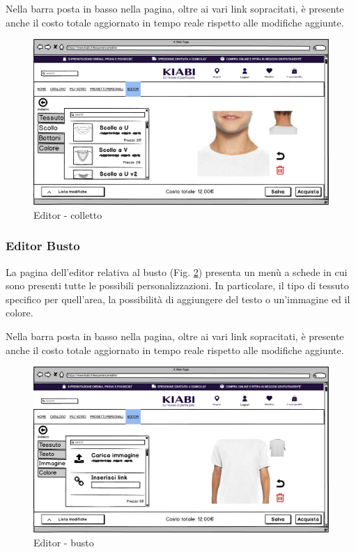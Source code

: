 \documentclass[12pt,italian,]{report}
\begin{document}
Nella barra posta in basso nella pagina, oltre ai vari link sopracitati, è presente anche il costo totale aggiornato in tempo reale rispetto alle modifiche aggiunte.

\begin{figure}[h]
\centering
\includegraphics{../../balsamiq/balsamiq_finale/Editor-caratteristicacolloscollo.png}
\caption{Editor - colletto}
\label{editor_colletto}
\end{figure}


\newpage
\subsubsection{Editor Busto} 

La pagina dell'editor relativa al busto (Fig. \ref{editor_busto}) presenta un menù a schede in cui sono presenti tutte le possibili personalizzazioni. In particolare, il tipo di tessuto specifico per quell'area, la possibilità di aggiungere del testo o un'immagine ed il colore.

Nella barra posta in basso nella pagina, oltre ai vari link sopracitati, è presente anche il costo totale aggiornato in tempo reale rispetto alle modifiche aggiunte.

\begin{figure}[h]
\centering
\includegraphics{../../balsamiq/balsamiq_finale/Editor-caratteristicabustoimmagine.png}
\caption{Editor - busto}
\label{editor_busto}
\end{figure}
\end{document}

